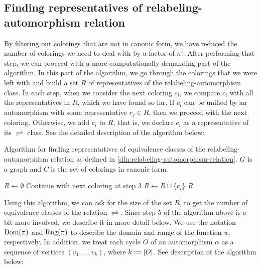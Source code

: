 \subsection{Finding representatives of relabeling-automorphism relation}

By filtering out colorings that are not in canonic form, we have reduced the number of colorings we need to deal with by a factor of $n!$. After performing that step, we can proceed with a more computationally demanding part of the algorithm. In this part of the algorithm, we go through the colorings that we were left with and build a set $R$ of representatives of the relabeling-automorphism class. In each step, when we consider the next coloring $c_i$, we compare $c_i$ with all the representatives in $R$, which we have found so far. If $c_i$ can be unified by an automorphism with some representative $r_j \in R$, then we proceed with the next coloring. Otherwise, we add $c_i$ to $R$, that is, we declare $c_i$ as a representative of its $\rightleftharpoons$ class. See the detailed description of the algorithm below:

\begin{algorithm}[H]
    \caption{Algorithm for finding representatives of equivalence classes of the relabeling-automorphism relation as defined in \ref{dfn:relabeling-automorphism-relation}. $G$ is a graph and $C$ is the set of colorings in canonic form.} 
    \begin{algorithmic}[1]
            \State $R \gets \emptyset$
                        \State Continue with next coloring at step 3
                    \EndIf
                \EndFor
                \State $R \gets R \cup \{c_i\}$
            \EndFor
            \State \Return $R$
        \EndFunction
    \end{algorithmic}
    \label{alg:representatives-of-relabeling-automorphism-relation}
\end{algorithm}

Using this algorithm, we can ask for the size of the set $R$, to get the number of equivalence classes of the relation $\rightleftharpoons$. Since step $5$ of the algorithm above is a bit more involved, we describe it in more detail below. We use the notation $\operatorname{Dom}(\pi)$ and $\operatorname{Rng}(\pi)$ to describe the domain and range of the function $\pi$, respectively. In addition, we treat each cycle $O$ of an automorphism $\alpha$ as a sequence of vertices $(v_1,\ldots,v_k)$, where $k := \left|{O}\right|$. See description of the algorithm below:

